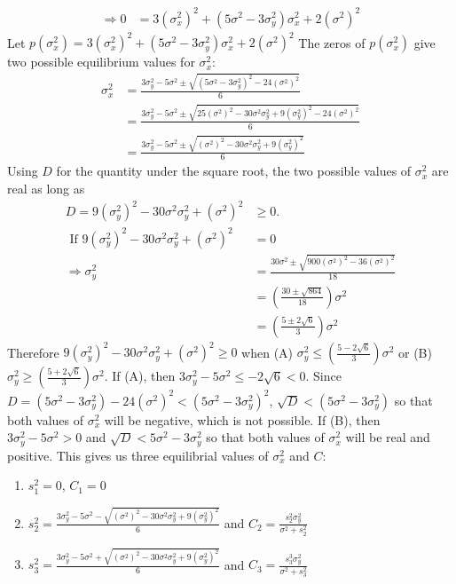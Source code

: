 \documentclass{article}
\newcommand\numberthis{\addtocounter{equation}{1}\tag{\theequation}}
\begin{document}
\begin{enumerate}
\begin{align*}
\\ \Rightarrow 0&=3(\sigma_x^2)^2+(5\sigma^2-3\sigma_y^2)\sigma_x^2+2(\sigma^2)^2
\end{align*}
Let $p(\sigma_x^2)=3(\sigma_x^2)^2+(5\sigma^2-3\sigma_y^2)\sigma_x^2+2(\sigma^2)^2$ The zeros of $p(\sigma_x^2)$ give two possible equilibrium values for $\sigma_x^2$:
\begin{align*}
\sigma_x^2&=\frac{3\sigma_y^2-5\sigma^2\pm\sqrt{(5\sigma^2-3\sigma_y^2)^2-24(\sigma^2)^2}}{6}
\\&=\frac{3\sigma_y^2-5\sigma^2\pm\sqrt{25(\sigma^2)^2-30\sigma^2\sigma_y^2+9(\sigma_y^2)^2-24(\sigma^2)^2}}{6}
\\&=\frac{3\sigma_y^2-5\sigma^2\pm\sqrt{(\sigma^2)^2-30\sigma^2\sigma_y^2+9(\sigma_y^2)^2}}{6}
\end{align*}
Using $D$ for the quantity under the square root, the two possible values of $\sigma_x^2$ are real as long as 
\begin{align*}
D=9(\sigma_y^2)^2-30\sigma^2\sigma_y^2+(\sigma^2)^2&\geq 0. %
\\\text{ If } 9(\sigma_y^2)^2-30\sigma^2\sigma_y^2+(\sigma^2)^2&=0
\\ \Rightarrow \sigma_y^2&=\frac{30\sigma^2\pm\sqrt{900(\sigma^2)^2-36(\sigma^2)^2}}{18}
\\ &=\left(\frac{30\pm\sqrt{864}}{18}\right)\sigma^2
\\&=\left(\frac{5\pm 2 \sqrt{6}}{3}\right)\sigma^2
\end{align*}
Therefore $9(\sigma_y^2)^2-30\sigma^2\sigma_y^2+(\sigma^2)^2\geq 0$ when (A) $\sigma_y^2\leq \left(\frac{5-2\sqrt{6}}{3}\right)\sigma^2$ or (B) $\sigma_y^2\geq \left(\frac{5+2\sqrt{6}}{3}\right)\sigma^2$. If (A), then $3\sigma_y^2-5\sigma^2\leq -2\sqrt{6}<0$. Since $D=(5\sigma^2-3\sigma_y^2)-24(\sigma^2)^2<(5\sigma^2-3\sigma_y^2)^2$, $\sqrt{D}<(5\sigma^2-3\sigma_y^2)$ so that both values of $\sigma_x^2$ will be negative, which is not possible. If (B), then $3\sigma_y^2-5\sigma^2>0$ and $\sqrt{D}<5\sigma^2-3\sigma_y^2$ so that both values of $\sigma_x^2$ will be real and positive.  This gives us three equilibrial values of $\sigma_x^2$ and $C$:
\begin{enumerate}[1.]
\item $s_1^2=0$, $C_1=0$
\item $s_2^{2}=\frac{3\sigma_y^2-5\sigma^2-\sqrt{(\sigma^2)^2-30\sigma^2\sigma_y^2+9(\sigma_y^2)^2}}{6}$ and $C_2=\frac{s_2^{2}\sigma_y^2}{\sigma^2+s_2^2}$
\item $s_3^{2}=\frac{3\sigma_y^2-5\sigma^2+\sqrt{(\sigma^2)^2-30\sigma^2\sigma_y^2+9(\sigma_y^2)^2}}{6}$ and $C_3=\frac{s_3^3\sigma_y^2}{\sigma^2+s_3^2}$

\end{enumerate}
\end{enumerate}
\end{document}
